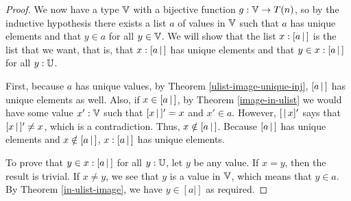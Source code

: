 \documentclass[../math.tex]{subfiles}
\begin{document}
\begin{proof}
    We now have a type $\mathbb{V}$ with a bijective function $g : \mathbb{V} \to T(n)$, so by
    the inductive hypothesis there exists a list $a$ of values in $\mathbb{V}$ such that
    $a$ has unique elements and that $y \in a$ for all $y \in \mathbb{V}$.  We will show
    that the list $x : [ a\, |\,]$ is the list that we want, that is, that $x
    :[ a\, |\,]$ has unique elements and that $y \in x :[ a\, |\,]$ for all $y : \mathbb{U}$.

    First, because $a$ has unique values, by Theorem
    \ref{ulist-image-unique-inj}, $[ a\, |\,]$ has unique elements as well.  Also,
    if $x \in [ a\, |\,]$, by Theorem \ref{image-in-ulist} we would have some value
    $x' : \mathbb{V}$ such that $[ x\, |\,]' = x$ and $x' \in a$.  However, $[ \,|\, x ]'$ says
    that $[ x\, |\,]' \neq x$, which is a contradiction.  Thus, $x \notin [ a\, |\,]$.
    Because $[ a\, |\,]$ has unique elements and $x \notin [ a\, |\,]$, $x : [ a\, |\,]$ has
    unique elements.

    To prove that $y \in x : [ a\, |\,]$ for all $y : \mathbb{U}$, let $y$ be any value.  If
    $x = y$, then the result is trivial.  If $x \neq y$, we see that $y$ is a
    value in $\mathbb{V}$, which means that $y \in a$.  By Theorem \ref{in-ulist-image},
    we have $y \in [a|]$ as required.
\end{proof}
\end{document}
